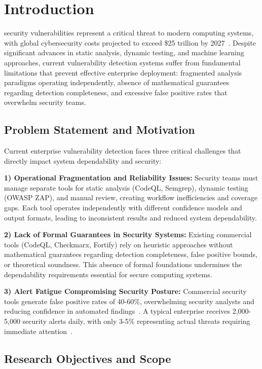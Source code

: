 \documentclass[10pt,journal,compsoc]{IEEEtran}
\begin{document}
\section{Introduction}
 security vulnerabilities represent a critical threat to modern computing systems, with global cybersecurity costs projected to exceed \$25 trillion by 2027~\cite{cybersecurity2024}. Despite significant advances in static analysis, dynamic testing, and machine learning approaches, current vulnerability detection systems suffer from fundamental limitations that prevent effective enterprise deployment: fragmented analysis paradigms operating independently, absence of mathematical guarantees regarding detection completeness, and excessive false positive rates that overwhelm security teams.

\subsection{Problem Statement and Motivation}

Current enterprise vulnerability detection faces three critical challenges that directly impact system dependability and security:

\textbf{1) Operational Fragmentation and Reliability Issues:} Security teams must manage separate tools for static analysis (CodeQL, Semgrep), dynamic testing (OWASP ZAP), and manual review, creating workflow inefficiencies and coverage gaps. Each tool operates independently with different confidence models and output formats, leading to inconsistent results and reduced system dependability.

\textbf{2) Lack of Formal Guarantees in Security Systems:} Existing commercial tools (CodeQL, Checkmarx, Fortify) rely on heuristic approaches without mathematical guarantees regarding detection completeness, false positive bounds, or theoretical soundness. This absence of formal foundations undermines the dependability requirements essential for secure computing systems.

\textbf{3) Alert Fatigue Compromising Security Posture:} Commercial security tools generate false positive rates of 40-60\%, overwhelming security analysts and reducing confidence in automated findings~\cite{ponemon2024}. A typical enterprise receives 2,000-5,000 security alerts daily, with only 3-5\% representing actual threats requiring immediate attention~\cite{cisco2024}.

\subsection{Research Objectives and Scope}
\end{document}
